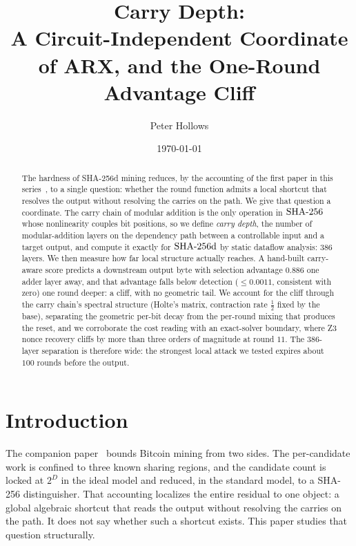\documentclass[11pt]{article}
\title{\textbf{Carry Depth:\\
A Circuit-Independent Coordinate of ARX, and the One-Round Advantage Cliff}}
\author{Peter Hollows}
\date{\today}
\begin{document}
\maketitle

\begin{abstract}
The hardness of SHA-256d mining reduces, by the accounting of the first
paper in this series~\cite{paperI}, to a single question: whether the round
function admits a local shortcut that resolves the output without resolving
the carries on the path. We give that question a coordinate. The carry
chain of modular addition is the only operation in $\mathrm{SHA\text{-}256}$ whose
nonlinearity couples bit positions, so we define \emph{carry depth}, the
number of modular-addition layers on the dependency path between a
controllable input and a target output, and compute it exactly for $\mathrm{SHA\text{-}256d}$
by static dataflow analysis: $386$ layers. We then measure how far local
structure actually reaches. A hand-built carry-aware score predicts a
downstream output byte with selection advantage $0.886$ one adder layer
away, and that advantage falls below detection ($\le 0.0011$, consistent
with zero) one round deeper: a cliff, with no geometric tail. We account
for the cliff through the carry chain's spectral structure (Holte's matrix,
contraction rate $\tfrac12$ fixed by the base), separating the geometric
per-bit decay from the per-round mixing that produces the reset, and we
corroborate the cost reading with an exact-solver boundary, where Z3 nonce
recovery cliffs by more than three orders of magnitude at round $11$. The
$386$-layer separation is therefore wide: the strongest local attack we
tested expires about $100$ rounds before the output.
\end{abstract}

\section{Introduction}

The companion paper~\cite{paperI} bounds Bitcoin mining from two sides. The
per-candidate work is confined to three known sharing regions, and the
candidate count is locked at $2^{D}$ in the ideal model and reduced, in the
standard model, to a SHA-256 distinguisher. That accounting localizes the
entire residual to one object: a global algebraic shortcut that reads the
output without resolving the carries on the path. It does not say whether
such a shortcut exists. This paper studies that question structurally.
\end{document}
